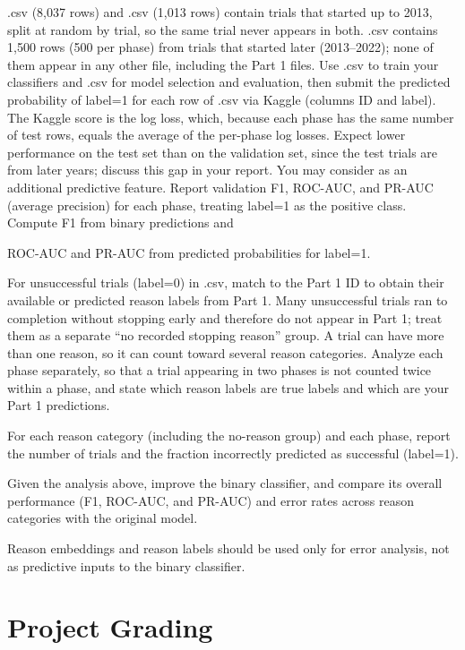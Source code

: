\documentclass[11pt,letterpaper]{article}
\begin{document}
.csv (8,037 rows) and .csv (1,013 rows) contain trials that started up to 2013, split at random by trial, so the same trial never appears in both. .csv contains 1,500 rows (500 per phase) from trials that started later (2013--2022); none of them appear in any other file, including the Part 1 files. Use .csv to train your classifiers and .csv for model selection and evaluation, then submit the predicted probability of label=1 for each row of .csv via Kaggle (columns ID and label). The Kaggle score is the log loss, which, because each phase has the same number of test rows, equals the average of the per-phase log losses. Expect lower performance on the test set than on the validation set, since the test trials are from later years; discuss this gap in your report. You may consider  as an additional predictive feature. Report validation F1, ROC-AUC, and PR-AUC (average precision) for each phase, treating label=1 as the positive class. Compute F1 from binary predictions and

ROC-AUC and PR-AUC from predicted probabilities for label=1.

For unsuccessful trials (label=0) in .csv, match  to the Part 1 ID
to obtain their available or predicted reason labels from Part 1. Many unsuccessful trials ran to
completion without stopping early and therefore do not appear in Part 1; treat them as a separate
``no recorded stopping reason'' group. A trial can have more than one reason, so it can count toward
several reason categories. Analyze each phase separately, so that a trial appearing in two phases is
not counted twice within a phase, and state which reason labels are true labels and which are your
Part 1 predictions.

For each reason category (including the no-reason group) and each phase, report the number of trials
and the fraction incorrectly predicted as successful (label=1).

Given the analysis above, improve the binary classifier, and compare its overall performance (F1,
ROC-AUC, and PR-AUC) and error rates across reason categories with the original model.

Reason embeddings and reason labels should be used only for error analysis, not as predictive inputs
to the binary classifier.

\section*{Project Grading}
\end{document}
